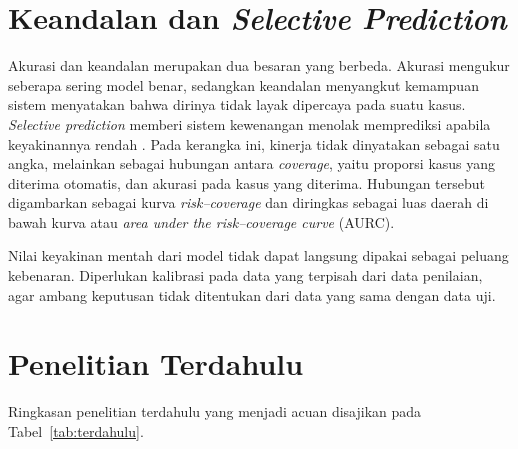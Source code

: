 \section{Keandalan dan \textit{Selective Prediction}}

Akurasi dan keandalan merupakan dua besaran yang berbeda. Akurasi mengukur
seberapa sering model benar, sedangkan keandalan menyangkut kemampuan sistem
menyatakan bahwa dirinya tidak layak dipercaya pada suatu kasus.
\textit{Selective prediction} memberi sistem kewenangan menolak memprediksi
apabila keyakinannya rendah \parencite{lin2026measurebench}. Pada kerangka ini,
kinerja tidak dinyatakan sebagai satu angka, melainkan sebagai hubungan antara
\textit{coverage}, yaitu proporsi kasus yang diterima otomatis, dan akurasi pada
kasus yang diterima. Hubungan tersebut digambarkan sebagai kurva
\textit{risk--coverage} dan diringkas sebagai luas daerah di bawah kurva atau
\textit{area under the risk--coverage curve} (AURC).

Nilai keyakinan mentah dari model tidak dapat langsung dipakai sebagai peluang
kebenaran. Diperlukan kalibrasi pada data yang terpisah dari data penilaian,
agar ambang keputusan tidak ditentukan dari data yang sama dengan data uji.

\section{Penelitian Terdahulu}

Ringkasan penelitian terdahulu yang menjadi acuan disajikan pada
Tabel~\ref{tab:terdahulu}.

